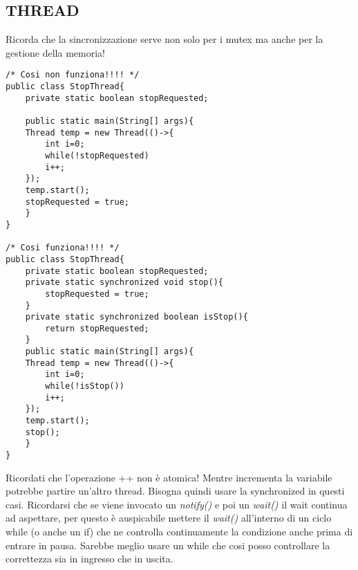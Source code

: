 \subsection{THREAD}
\noindent Ricorda che la sincronizzazione serve non solo per i mutex ma anche per la gestione della memoria!
\begin{lstlisting}
/* Cosi non funziona!!!! */
public class StopThread{
	private static boolean stopRequested;
	
	public static main(String[] args){
	Thread temp = new Thread(()->{
		int i=0;
		while(!stopRequested)
		i++;
	});
	temp.start();
	stopRequested = true;
	}
}

/* Cosi funziona!!!! */
public class StopThread{
	private static boolean stopRequested;
	private static synchronized void stop(){
		stopRequested = true;
	}
	private static synchronized boolean isStop(){
		return stopRequested;
	}	
	public static main(String[] args){
	Thread temp = new Thread(()->{
		int i=0;
		while(!isStop())
		i++;
	});
	temp.start();
	stop();
	}
}
\end{lstlisting}

\noindent Ricordati che l'operazione ++ non è atomica! Mentre incrementa la variabile potrebbe partire un'altro thread. Bisogna quindi usare la synchronized in questi casi. \newline
Ricordarsi che se viene invocato un \textit{notify()} e poi un \textit{wait()} il wait continua ad aspettare, per questo è auspicabile mettere il \textit{wait()} all'interno di un ciclo while (o anche un if) che ne controlla continuamente la condizione anche prima di entrare in pausa. Sarebbe meglio usare un while che cosi posso controllare la correttezza sia in ingresso che in uscita.

